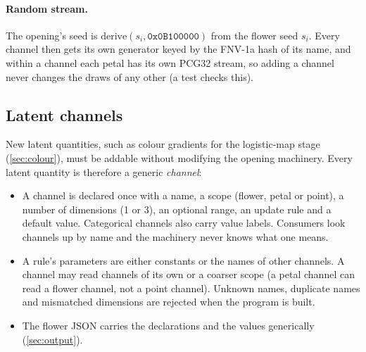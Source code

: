 \paragraph{Random stream.} The opening's seed is
$\mathrm{derive}(s_i, \texttt{0x0B100000})$ from the flower seed $s_i$. Every
channel then gets its own generator keyed by the FNV-1a hash of its name, and
within a channel each petal has its own PCG32 stream, so adding a channel
never changes the draws of any other (a test checks this).

\subsection{Latent channels}\label{sec:channels}

New latent quantities, such as colour gradients for the logistic-map stage
(\cref{sec:colour}), must be addable without modifying the opening machinery.
Every latent quantity is therefore a generic \emph{channel}:
\begin{itemize}[leftmargin=*]
\item A channel is declared once with a name, a scope (flower, petal or
  point), a number of dimensions (1 or 3), an optional range, an update rule
  and a default value. Categorical channels also carry value labels. Consumers
  look channels up by name and the machinery never knows what one means.
\item A rule's parameters are either constants or the names of other
  channels. A channel may read channels of its own or a coarser scope (a petal
  channel can read a flower channel, not a point channel). Unknown names,
  duplicate names and mismatched dimensions are rejected when the program is
  built.
\item The flower JSON carries the declarations and the values generically
  (\cref{sec:output}).
\end{itemize}

